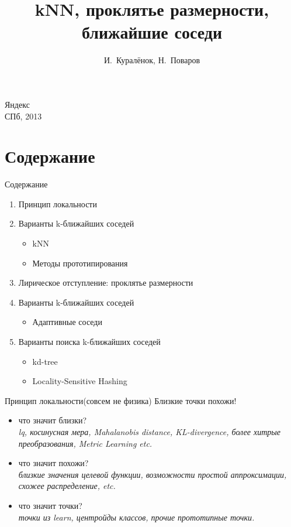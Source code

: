 \documentclass[14pt, fleqn, xcolor={dvipsnames, table}]{beamer}
\title{kNN, проклятье размерности, ближайшие соседи\\\small{}}
\author[]{\small{%
И.~Куралёнок,
Н.~Поваров}}
\date{}
\begin{document}
\begin{frame}
\maketitle
\small
\begin{center}
\vspace{-60pt}
\normalsize {\color{red}Я}ндекс \\
\vspace{80pt}
\footnotesize СПб, 2013
\end{center}
\end{frame}

\section{Содержание}
\begin{frame}{Содержание}
\begin{enumerate}
  \item Принцип локальности
  \item Варианты k-ближайших соседей
  \begin{itemize}
    \item kNN
    \item Методы прототипирования
  \end{itemize}
  \item Лирическое отступление: проклятье размерности
  \item Варианты k-ближайших соседей
  \begin{itemize}
    \item Адаптивные соседи
  \end{itemize}
  \item Варианты поиска k-ближайших соседей
  \begin{itemize}
    \item kd-tree
    \item Locality-Sensitive Hashing
  \end{itemize}
\end{enumerate}
\end{frame}

\begin{frame}{Принцип локальности(совсем не физика)}
  Близкие точки похожи!
  \begin{itemize}
    \item что значит близки? \\
    \emph{lq, косинусная мера, Mahalanobis distance, KL-divergence, более хитрые преобразования, Metric Learning etc.}
    \item что значит похожи? \\
    \emph{близкие значения целевой функции, возможности простой аппроксимации, схожее распределение, etc.}
    \item что значит точки? \\
    \emph{точки из learn, центройды классов, прочие прототипные точки.}
  \end{itemize}
\end{frame}
\end{document}

